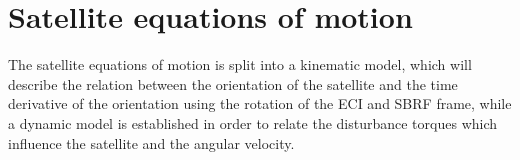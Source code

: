 \section{Satellite equations of motion }
The satellite equations of motion is split into a kinematic model, which will describe the relation between the orientation of the satellite and the time derivative of the orientation using the rotation of the ECI and SBRF  frame, while a dynamic model is established in order to relate the disturbance torques which influence the satellite and the angular velocity.

